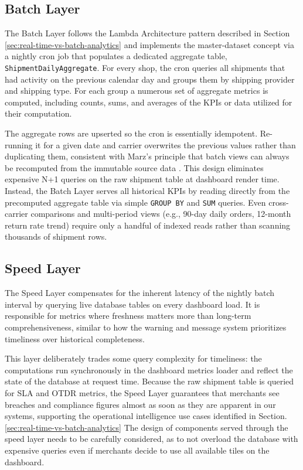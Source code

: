 \documentclass{imc-inf}
\begin{document}
\subsection{Batch Layer}

The Batch Layer follows the Lambda Architecture pattern described in Section \ref{sec:real-time-vs-batch-analytics} and implements the master-dataset concept via a nightly cron job that populates a dedicated aggregate table, \texttt{ShipmentDailyAggregate}.
For every shop, the cron queries all shipments that had activity on the previous calendar day and groups them by shipping provider and shipping type.
For each group a numerous set of aggregate metrics is computed, including counts, sums, and averages of the KPIs or data utilized for their computation.

The aggregate rows are upserted so the cron is essentially idempotent. Re-running it for a given date and carrier overwrites the previous values rather than duplicating them, consistent with Marz's principle that batch views can always be recomputed from the immutable source data \cite{marzHowBeatCAP2011}.
This design eliminates expensive N+1 queries on the raw shipment table at dashboard render time.
Instead, the Batch Layer serves all historical KPIs by reading directly from the precomputed aggregate table via simple \texttt{GROUP BY} and \texttt{SUM} queries.
Even cross-carrier comparisons and multi-period views (e.g., 90-day daily orders, 12-month return rate trend) require only a handful of indexed reads rather than scanning thousands of shipment rows.

\subsection{Speed Layer}

The Speed Layer compensates for the inherent latency of the nightly batch interval by querying live database tables on every dashboard load.
It is responsible for metrics where freshness matters more than long-term comprehensiveness, similar to how the warning and message system prioritizes timeliness over historical completeness.

This layer deliberately trades some query complexity for timeliness: the computations run synchronously in the dashboard metrics loader and reflect the state of the database at request time.
Because the raw shipment table is queried for SLA and OTDR metrics, the Speed Layer guarantees that merchants see breaches and compliance figures almost as soon as they are apparent in our systems, supporting the operational intelligence use cases identified in Section. \ref{sec:real-time-vs-batch-analytics}
The design of components served through the speed layer needs to be carefully considered, as to not overload the database with expensive queries even if merchants decide to use all available tiles on the dashboard.
\end{document}
